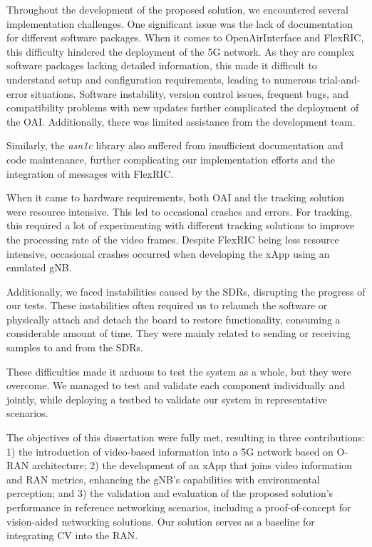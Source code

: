 Throughout the development of the proposed solution, we encountered several implementation challenges.
One significant issue was the lack of documentation for different software packages.
When it comes to OpenAirInterface and FlexRIC, this difficulty hindered the deployment of the 5G network.
As they are complex software packages lacking detailed information, this made it difficult to understand setup and configuration requirements, leading to numerous trial-and-error situations.
Software instability, version control issues, frequent bugs, and compatibility problems with new updates further complicated the deployment of the OAI\@.
Additionally, there was limited assistance from the development team.

Similarly, the \emph{asn1c} library also suffered from insufficient documentation and code maintenance, further complicating our implementation efforts and the integration of messages with FlexRIC\@.

When it came to hardware requirements, both OAI and the tracking solution were resource intensive.
This led to occasional crashes and errors.
For tracking, this required a lot of experimenting with different tracking solutions to improve the processing rate of the video frames.
Despite FlexRIC being less resource intensive, occasional crashes occurred when developing the xApp using an emulated gNB\@.

Additionally, we faced instabilities caused by the SDRs, disrupting the progress of our tests.
These instabilities often required us to relaunch the software or physically attach and detach the board to restore functionality, consuming a considerable amount of time.
They were mainly related to sending or receiving samples to and from the SDRs.

These difficulties made it arduous to test the system as a whole, but they were overcome.
We managed to test and validate each component individually and jointly, while deploying a testbed to validate our system in representative scenarios.

The objectives of this dissertation were fully met, resulting in three contributions: 1) the introduction of video-based information into a 5G network based on O-RAN architecture; 2) the development of an xApp that joins video information and RAN metrics, enhancing the gNB's capabilities with environmental perception; and 3) the validation and evaluation of the proposed solution's performance in reference networking scenarios, including a proof-of-concept for vision-aided networking solutions.
Our solution serves as a baseline for integrating CV into the RAN\@.

